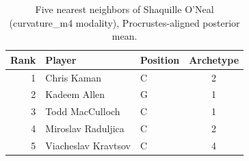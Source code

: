 \begin{table}[htbp]
  \centering\small
  \begin{tabular}{rllc}
    \toprule
    Rank & Player & Position & Archetype \\
    \midrule
    1 & Chris Kaman & C & 2 \\
    2 & Kadeem Allen & G & 1 \\
    3 & Todd MacCulloch & C & 1 \\
    4 & Miroslav Raduljica & C & 2 \\
    5 & Viacheslav Kravtsov & C & 4 \\
    \bottomrule
  \end{tabular}
  \caption{Five nearest neighbors of Shaquille O'Neal (curvature_m4 modality), Procrustes-aligned posterior mean.}
  \label{tab:Shaquille_O_Neal_neighbors_curvature_m4}
\end{table}

